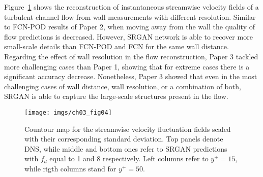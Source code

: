 Figure~\ref{ch03:fig04} shows the reconstruction of instantaneous streamwise velocity fields of a turbulent channel flow from wall measurements with different resolution.
Similar to FCN-POD results of Paper 2, when moving away from the wall the quality of flow predictions is decreased.
However, SRGAN network is able to recover more small-scale details than FCN-POD and FCN for the same wall distance.
Regarding the effect of wall resolution in the flow reconstruction, Paper 3 tackled more challenging cases than Paper 1, showing that for extreme cases there is a significant accuracy decrease.
Nonetheless, Paper 3 showed that even in the most challenging cases of wall distance, wall resolution, or a combination of both, SRGAN is able to capture the large-scale structures present in the flow.
\begin{figure}
  \centering
  \texttt{[image: imgs/ch03\_fig04]}
  \caption{\label{ch03:fig04}Countour map for the streamwise velocity fluctuation fields scaled with their corresponding standard deviation. Top panels denote DNS, while middle and bottom ones refer to SRGAN predictions with $f_d$ equal to 1 and 8 respectively. Left columns refer to $y^+=15$, while rigth columns stand for $y^+=50$.}
\end{figure}
